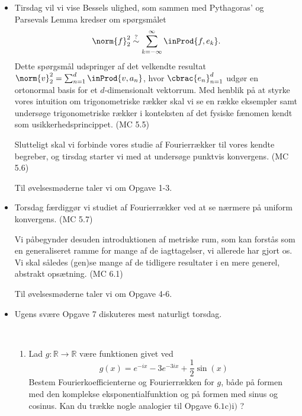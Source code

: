 \begin{itemize}
    \item Tirsdag vil vi vise Bessels ulighed, som sammen med Pythagoras' og Parsevals Lemma kredser om spørgsmålet
    $$ \norm{f}_2^2 \overset{?}{\sim} \sum_{k=-\infty}^\infty \inProd{f,e_k}. $$
    Dette spørgsmål udspringer af det velkendte resultat $\norm{v}_2^2 = \sum_{n=1}^d \inProd{v,a_n}$, hvor $\cbrac{e_n}_{n=1}^d$ udgør en ortonormal basis for et $d$-dimensionalt vektorrum. Med henblik på at styrke vores intuition om trigonometriske rækker skal vi se en række eksempler samt undersøge trigonometriske rækker i konteksten af det fysiske fænomen kendt som usikkerhedsprincippet. (MC 5.5)
    
    Slutteligt skal vi forbinde vores studie af Fourierrækker til vores kendte begreber, og tirsdag starter vi med at undersøge punktvis konvergens. (MC 5.6)
    
    Til øvelsesmøderne taler vi om Opgave 1-3.
    
    \item Torsdag færdiggør vi studiet af Fourierrækker ved at se nærmere på uniform konvergens. (MC 5.7)
    
    Vi påbegynder desuden introduktionen af metriske rum, som kan forstås som en generaliseret ramme for mange af de iagttagelser, vi allerede har gjort os. Vi skal således (gen)se mange af de tidligere resultater i en mere generel, abstrakt opsætning. (MC 6.1)
    
    Til øvelsesmøderne taler vi om Opgave 4-6.
    
    \item Ugens svære Opgave 7 diskuteres mest naturligt torsdag.
    
    \begin{opg}[Fourierrækker I]\hfill \\
\begin{enumerate}
 \item Lad $g: \mathbb{R} \rightarrow \mathbb{R}$ være funktionen givet ved
 $$
 g(x)=e^{-i x}-3 e^{-3 i x}+\frac{1}{2} \sin (x)
 $$
 Bestem Fourierkoefficienterne og Fourierrækken for $g$, både på formen med den komplekse eksponentialfunktion og på formen med sinus og cosinus. Kan du trække nogle analogier til Opgave $6.1 \mathrm{c}) \mathrm{i})$ ?
 

\end{enumerate}
\end{opg}
\end{itemize}
